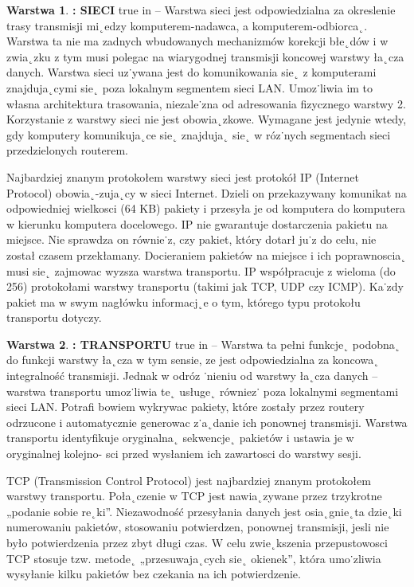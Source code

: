 \documentclass[a4paper,11pt]{article}
\theoremstyle{definition}
\newtheorem{tw}{Warstwa}
\begin{document}
\begin{tw}\textbf{: SIECI}
	 true in 
	-- Warstwa sieci jest odpowiedzialna za okreslenie trasy transmisji mi˛edzy
	komputerem-nadawca, a komputerem-odbiorca˛. Warstwa ta nie ma zadnych wbudowanych mechanizmów korekcji błe˛dów i w zwia˛zku z tym musi polegac na wiarygodnej transmisji
	koncowej warstwy ła˛cza danych. Warstwa sieci uz˙ywana jest do komunikowania sie˛
	z komputerami znajduja˛cymi sie˛ poza lokalnym segmentem sieci LAN. Umoz˙liwia im to
	własna architektura trasowania, niezale˙zna od adresowania fizycznego warstwy 2. Korzystanie
	z warstwy sieci nie jest obowia˛zkowe. Wymagane jest jedynie wtedy, gdy komputery
	komunikuja˛ce sie˛ znajduja˛ sie˛ w róz˙nych segmentach sieci przedzielonych routerem.\medskip
	
	\noindent \hspace{0.9cm}
	Najbardziej znanym protokołem warstwy sieci jest protokół IP (Internet Protocol) obowia˛-zuja˛cy w sieci Internet. Dzieli on przekazywany komunikat na odpowiedniej wielkosci
	(64 KB) pakiety i przesyła je od komputera do komputera w kierunku komputera docelowego.
	IP nie gwarantuje dostarczenia pakietu na miejsce. Nie sprawdza on równie˙z, czy
	pakiet, który dotarł ju˙z do celu, nie został czasem przekłamany. Docieraniem pakietów na
	miejsce i ich poprawnoscia˛ musi sie˛ zajmowac wyzsza warstwa transportu. IP współpracuje
	z wieloma (do 256) protokołami warstwy transportu (takimi jak TCP, UDP czy ICMP).
	Ka˙zdy pakiet ma w swym nagłówku informacj˛e o tym, którego typu protokołu transportu
	dotyczy.
\end{tw}
\begin{tw}\textbf{: TRANSPORTU}
	 true in 
	-- Warstwa ta pełni funkcje˛ podobna˛ do funkcji warstwy ła˛cza
	w tym sensie, ze jest odpowiedzialna za koncowa˛ integralność transmisji. Jednak w odróz
	˙nieniu od warstwy ła˛cza danych – warstwa transportu umoz˙liwia te˛ usługe˛ równiez˙ poza
	lokalnymi segmentami sieci LAN. Potrafi bowiem wykrywac pakiety, które zostały przez
	routery odrzucone i automatycznie generowac z˙a˛danie ich ponownej transmisji. Warstwa
	transportu identyfikuje oryginalna˛ sekwencje˛ pakietów i ustawia je w oryginalnej kolejno-
	sci przed wysłaniem ich zawartosci do warstwy sesji.\medskip
	
	\noindent \hspace{0.9cm}
	TCP (Transmission Control Protocol) jest najbardziej znanym protokołem warstwy transportu.
	Poła˛czenie w TCP jest nawia˛zywane przez trzykrotne „podanie sobie re˛ki”. Niezawodność przesyłania danych jest osia˛gnie˛ta dzie˛ki numerowaniu pakietów, stosowaniu potwierdzen, ponownej transmisji, jesli nie było potwierdzenia przez zbyt długi czas. W celu
	zwie˛kszenia przepustowosci TCP stosuje tzw. metode˛ „przesuwaja˛cych sie˛ okienek”, która
	umo˙zliwia wysyłanie kilku pakietów bez czekania na ich potwierdzenie.
\end{tw}
\end{document}
